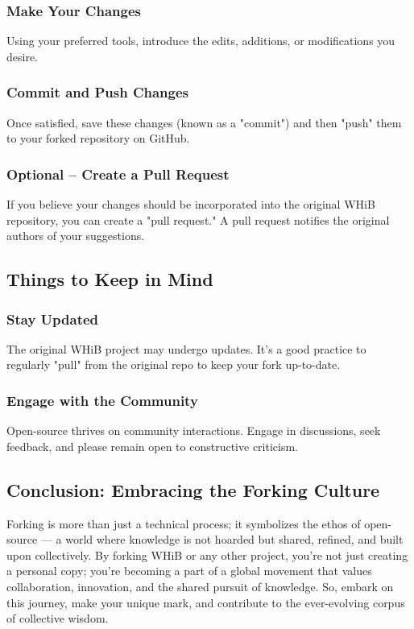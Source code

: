 \documentclass[a4paper,12pt]{book}
\begin{document}
\subsubsection*{Make Your Changes}
Using your preferred tools, introduce the edits, additions, or modifications you desire.

\subsubsection*{Commit and Push Changes}
Once satisfied, save these changes (known as a "commit") and then "push" them to your forked repository on GitHub.

\subsubsection*{Optional – Create a Pull Request}
If you believe your changes should be incorporated into the original WHiB repository, you can create a "pull request." A pull request notifies the original authors of your suggestions.

\subsection*{Things to Keep in Mind}
\subsubsection*{Stay Updated}
The original WHiB project may undergo updates. It's a good practice to regularly "pull" from the original repo to keep your fork up-to-date.

\subsubsection*{Engage with the Community}
Open-source thrives on community interactions. Engage in discussions, seek feedback, and please remain open to constructive criticism.

\subsection*{Conclusion: Embracing the Forking Culture}
Forking is more than just a technical process; it symbolizes the ethos of open-source — a world where knowledge is not hoarded but shared, refined, and built upon collectively. By forking WHiB or any other project, you're not just creating a personal copy; you're becoming a part of a global movement that values collaboration, innovation, and the shared pursuit of knowledge. So, embark on this journey, make your unique mark, and contribute to the ever-evolving corpus of collective wisdom.
\end{document}
